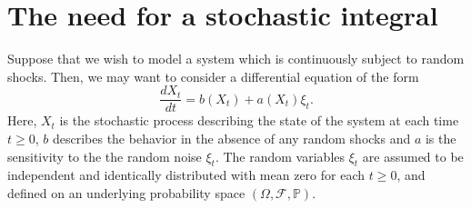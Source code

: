 \documentclass[12pt]{article}
\begin{document}

\section{The need for a stochastic integral}

Suppose that we wish to model a system which is continuously subject to random shocks. Then, we may want to consider a differential equation of the form
\begin{equation}\label{eq:1}
\frac{dX_t}{dt}=b(X_t)+a(X_t)\xi_t.
\end{equation}
Here, $X_t$ is the stochastic process describing the state of the system at each time $t\ge 0$, $b$ describes the behavior in the absence of any random shocks and $a$ is the sensitivity to the the random  noise $\xi_t$. The random variables $\xi_t$ are assumed to be independent and identically distributed with mean zero for each $t\ge 0$, and defined on an underlying probability space $(\Omega,\mathcal{F},\mathbb{P})$.
\end{document}
